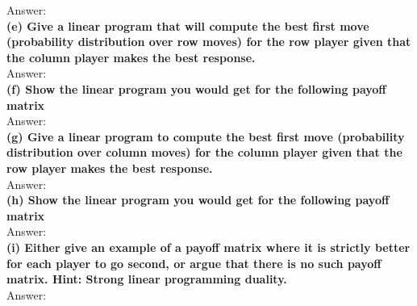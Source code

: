 \documentclass{article}
\begin{document}
Answer: \\ \newline
\textbf{(e) Give a linear program that will compute the best first move (probability distribution over row moves) for the row player given that the column player makes the best response.} \\ \newline
Answer: \\ \newline
\textbf{(f) Show the linear program you would get for the following payoff matrix} \\ \newline
Answer: \\ \newline
\textbf{(g) Give a linear program to compute the best first move (probability distribution over column moves) for the column player given that the row player makes the best response.} \\ \newline
Answer: \\ \newline
\textbf{(h) Show the linear program you would get for the following payoff matrix}\\ \newline
Answer: \\ \newline
\textbf{(i) Either give an example of a payoff matrix where it is strictly better for each player to go second, or argue that there is no such payoff matrix.
Hint: Strong linear programming duality.} \\ \newline
Answer: 
\end{document}
